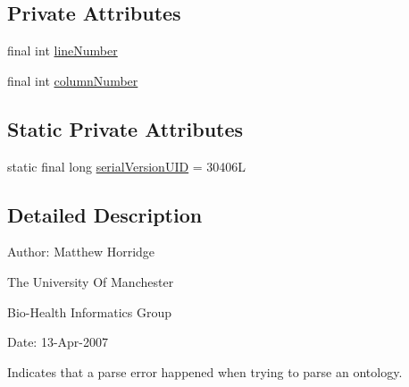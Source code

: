 \subsection*{Private Attributes}
\begin{DoxyCompactItemize}
\item 
final int \hyperlink{classorg_1_1semanticweb_1_1owlapi_1_1io_1_1_o_w_l_parser_exception_a5a5d515eefd8c2871627e152d86c03c2}{line\-Number}
\item 
final int \hyperlink{classorg_1_1semanticweb_1_1owlapi_1_1io_1_1_o_w_l_parser_exception_af0ad50fb6962ba9b17a4e358e1b82d38}{column\-Number}
\end{DoxyCompactItemize}
\subsection*{Static Private Attributes}
\begin{DoxyCompactItemize}
\item 
static final long \hyperlink{classorg_1_1semanticweb_1_1owlapi_1_1io_1_1_o_w_l_parser_exception_afa348bd541048a15b4a35e559bf7a4e2}{serial\-Version\-U\-I\-D} = 30406\-L
\end{DoxyCompactItemize}


\subsection{Detailed Description}
Author\-: Matthew Horridge\par
 The University Of Manchester\par
 Bio-\/\-Health Informatics Group\par
 Date\-: 13-\/\-Apr-\/2007\par
\par


Indicates that a parse error happened when trying to parse an ontology. 

